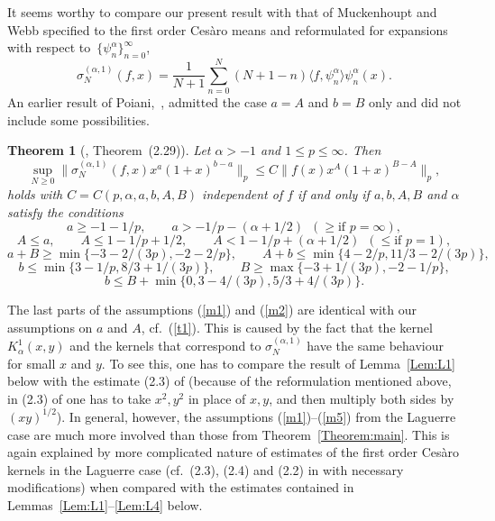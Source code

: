 \documentclass[leqno,a4paper]{amsart}
\newtheorem*{TheoremKnown}{Theorem}
\begin{document}
It seems worthy to compare our present result with that of Muckenhoupt and Webb
\cite{Mu-We} specified to the first order Ces\`aro means and reformulated
for expansions with respect to~$\{\psi^\alpha_n\}_{n=0}^\infty$,
$$
\sigma_N^{(\alpha,1)}(f,x) = \frac1{N+1}\sum_{n=0}^N(N+1-n)
\langle f,\psi^\alpha_n\rangle\psi^\alpha_n(x).
$$
An earlier result of Poiani,~\cite{Po}, admitted the case $a=A$ and $b=B$
only and did not include some possibilities.

\begin{TheoremKnown}[\cite{Mu-We}, Theorem~(2.29)]
Let $\alpha>-1$ and $1\le p\le\infty$.
Then
\begin{equation}
\sup_{N\ge0}\|\sigma_N^{(\alpha,1)}(f,x)x^a(1+x)^{b-a}\|_p
\le C\|f(x)x^A(1+x)^{B-A}\|_p,
\label{m6}
\end{equation}
holds with $C=C(p,\alpha,a,b,A,B)$ independent of $f$ if and only if
$a,b,A,B$ and $\alpha$ satisfy the conditions
\begin{equation}
a\ge-1-1/p, \qquad a>-1/p-(\alpha+1/2)\,\,\,(\ge \text{if } p=\infty),
\label{m1}
\end{equation}
\begin{equation}
A\le a,\qquad A\le 1-1/p+1/2,\qquad A<1-1/p+(\alpha+1/2)
\,\,\,(\le \text{if } p=1),
\label{m2}
\end{equation}
\begin{equation}
a+B\ge\min\{-3-2/(3p),-2-2/p\},\qquad A+b\le\min\{4-2/p,11/3-2/(3p)\},
\label{m3}
\end{equation}
\begin{equation}
b\le\min\{3-1/p,8/3+1/(3p)\},\qquad B\ge\max\{-3+1/(3p),-2-1/p\},
\label{m4}
\end{equation}
\begin{equation}
b\le B+\min\{0,3-4/(3p),5/3+4/(3p)\}.
\label{m5}
\end{equation}
\end{TheoremKnown}

The last parts of the assumptions (\ref{m1}) and (\ref{m2}) are identical
with our assumptions on $a$ and $A$, cf.~(\ref{t1}). This is caused by the
fact that the kernel $K^1_\alpha(x,y)$ and the kernels that correspond to
$\sigma^{(\alpha,1)}_N$ have the same behaviour for small $x$ and $y$. To see
this, one has to compare the result of Lemma~\ref{Lem:L1} below with the estimate
(2.3) of \cite{Mu-We} (because of the reformulation mentioned above, in
(2.3) of \cite{Mu-We} one has to take $x^2, y^2$ in place of $x, y$, and then
multiply both sides by $(xy)^{1/2}$). In general, however, the assumptions
(\ref{m1})--(\ref{m5}) from the Laguerre case are much more involved than
those from Theorem~\ref{Theorem:main}.
This is again explained by more complicated nature of estimates of the
first order Ces\`aro kernels in the Laguerre case (cf.~(2.3), (2.4)
and (2.2) in \cite{Mu-We} with necessary modifications) when compared
with the estimates contained in Lemmas~\ref{Lem:L1}--\ref{Lem:L4} below.
\end{document}
